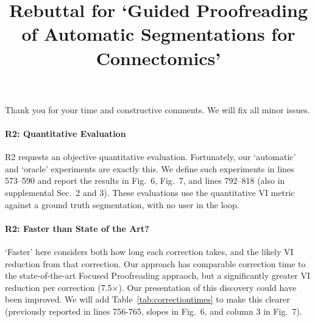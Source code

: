 \documentclass[10pt,twocolumn,letterpaper]{article}
\begin{document}
\title{Rebuttal for `Guided Proofreading of Automatic Segmentations for Connectomics'}  %

\maketitle
\thispagestyle{empty}

Thank you for your time and constructive comments. We will fix all minor issues.

\paragraph{R2: Quantitative Evaluation}
R2 requests an objective quantitative evaluation. Fortunately, our `automatic' and `oracle' experiments are exactly this. We define such experiments in lines 573--590 and report the results in Fig.~6, Fig.~7, and lines 792--818 (also in supplemental Sec.~2 and 3). These evaluations use the quantitative VI metric against a ground truth segmentation, with no user in the loop.

\paragraph{R2: Faster than State of the Art?}
`Faster' here considers both how long each correction takes, and the likely VI reduction from that correction. Our approach has comparable correction time to the state-of-the-art Focused Proofreading appraoch, but a significantly greater VI reduction per correction (7.5$\times$). Our presentation of this discovery could have been improved. We will add Table~\ref{tab:correctiontimes} to make this clearer (previously reported in lines 756-765, slopes in Fig.~6, and column 3 in Fig.~7).

\begin{table}[h]
\caption{Average proofreading speed for users of Dojo, Focused Proofreading (FP) and our Guided Proofreading (GP). For comparable correction time, our system achieves significantly higher VI reduction per minute (7.5$\times$) over state-of-the-art FP.}%
\label{tab:correctiontimes}
\end{table}
\end{document}
